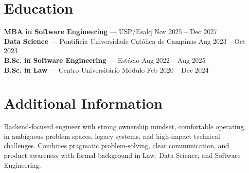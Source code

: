 \documentclass[11pt,a4paper]{article}
\begin{document}
\section*{Education}

\textbf{MBA in Software Engineering} — USP/Esalq \hfill Nov 2025 – Dec 2027 \\

\textbf{Data Science} — Pontifícia Universidade Católica de Campinas \hfill Aug 2023 – Oct 2023 \\

\textbf{B.Sc. in Software Engineering} — Estácio \hfill Aug 2022 – Aug 2025 \\

\textbf{B.Sc. in Law} — Centro Universitário Módulo \hfill Feb 2020 – Dec 2024 \\

\section*{Additional Information}
Backend-focused engineer with strong ownership mindset, comfortable operating in ambiguous problem spaces, legacy systems, and high-impact technical challenges. Combines pragmatic problem-solving, clear communication, and product awareness with formal background in Law, Data Science, and Software Engineering.
\end{document}
